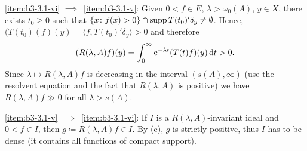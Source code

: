 \ref{item:b3-3.1-vi} $\implies$~\ref{item:b3-3.1-v}: Given $0 < f \in E$, $\lambda > \omega_{0}(A)$, $y \in X$, there exists $t_{0} \geq 0$ such that 
$\{x \colon f(x) > 0\} \cap \mathop{}\!\mathrm{supp}\, T(t_{0})'\delta_{y} \neq \emptyset$.
Hence, $(T(t_{0})(f)(y) = \langle f,T(t_{0})'\delta_{y} \rangle > 0$ and therefore
\[
(R(\lambda,A)f)(y) = \int_{0}^{\infty} \mathrm{e}^{-\lambda t}(T(t)f)(y) \mathop{}\!\mathrm{d}{t} > 0 .
\]
Since $\lambda \mapsto R(\lambda,A)f$ is decreasing in the interval $(s(A),\infty)$ (use the resolvent equation and the fact that $R(\lambda,A)$ is positive) we have $R(\lambda,A)f \gg 0$ for all $\lambda > s(A)$.

\ref{item:b3-3.1-v} $\implies$~\ref{item:b3-3.1-vi}: If\/ $I$ is a $R(\lambda,A)$-invariant ideal and $0 < f \in I$, then $g \coloneq R(\lambda,A)f \in I$. 
By (e), $g$ is strictly positive, thus $I$ has to be dense (it contains all functions of compact support). 

